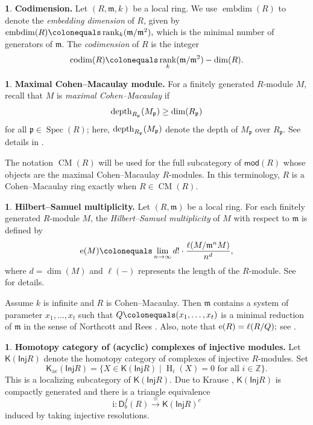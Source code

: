 \documentclass{amsart}
\DeclareMathOperator{\rank}{rank}
\DeclareMathOperator{\embdim}{embdim}
\DeclareMathOperator{\h}{H}
\newcommand{\Z}{\mathbb{Z}}
\newcommand{\D}{\mathsf{D}}
\newcommand{\K}{\mathsf{K}}
\newcommand{\0}{{\bf{0}}}
\newcommand{\m}{\mathfrak{m}}
\newcommand{\p}{\mathfrak{p}}
\DeclareMathOperator{\CM}{CM}
\DeclareMathOperator{\Spec}{Spec}
\DeclareMathOperator{\ac}{ac}
\DeclareMathOperator{\codim}{codim}
\newcommand{\Inj}{\mathsf{Inj}}
\newcommand{\mo}{\mathsf{mod}}
\theoremstyle{definition}
\newtheorem{chunk}[theorem]{}
\begin{document}
\begin{chunk}
    \textbf{Codimension.} 
    Let $(R,\m,k)$ be a local ring. We use $\embdim(R)$ to denote the \emph{embedding dimension} of $R$, given by
$\embdim(R)\colonequals\rank_k(\m/\m^2),
$
which is the minimal number of generators of $\m$. The \emph{codimension} of $R$ is the integer
\[
\codim(R)\colonequals\rank_k(\m/\m^2)-\dim(R).
\]
\end{chunk}



\begin{chunk}
\textbf{Maximal Cohen--Macaulay module.}
For a finitely generated
$R$-module $M$, recall that $M$ is \emph{maximal Cohen--Macaulay} if
\[
\depth_{R_\p}(M_\p)\geq \dim (R_\p)
\]
for all $\p\in\Spec(R)$; here, $\depth_{R_\p}(M_\p)$ denote the depth of $M_\p$ over $R_\p$. See details in \cite[Section 2.1]{BH}.

The notation $\CM(R)$ will be used for the full subcategory of $\mo(R)$ whose
objects are the maximal Cohen--Macaulay $R$-modules. In this terminology,
$R$ is a Cohen--Macaulay ring exactly when $R\in\CM(R)$.
\end{chunk}
\begin{chunk}\label{multiplicity}
\textbf{Hilbert--Samuel multiplicity.}
Let $(R,\m)$ be a local ring. For each finitely generated $R$-module $M$, the \emph{Hilbert--Samuel multiplicity} of $M$ with respect to $\m$ is defined by
\[
{\rm e}(M)\colonequals \lim_{n\to\infty} d!\cdot\frac{\ell(M/\m^nM)}{n^d},
\]
where $d=\dim(M)$ and $\ell(-)$ represents the length of the $R$-module. See \cite[Section 4.6]{BH} for details.

Assume $k$ is infinite and $R$ is Cohen--Macaulay.  Then $\m$ contains a system of parameter $x_1,\ldots,x_t$ such that $Q\colonequals (x_1,\ldots,x_t)$ is a minimal reduction of $\m$ in the sense of Northcott and Rees \cite[Definition 2]{NR}.
Also, note that
$
{\rm e} (R)=\ell (R/Q);
$
see \cite[Exercise 4.6.24(a)]{BH}.
\end{chunk}
\begin{chunk}
\textbf{Homotopy category of (acyclic) complexes of injective modules.} Let $\K(\Inj R)$ denote the homotopy category of complexes of injective $R$-modules. Set
$$
\K_{\ac}(\Inj R)=\{X\in\K(\Inj R)\mid \h_i(X)=0 \text{ for all }i\in\Z\}.
$$
 This is a localizing subcategory of $\K(\Inj R)$.  Due to Krause \cite[Proposition 2.3]{Krause2005}, $\K(\Inj R)$ is compactly generated and there is a triangle equivalence
 $$
 \text{i}\colon \D^{f}_b(R)\xrightarrow \equiv\K(\Inj R)^{c}
 $$
 induced by taking injective resolutions.
\end{chunk}
\end{document}
